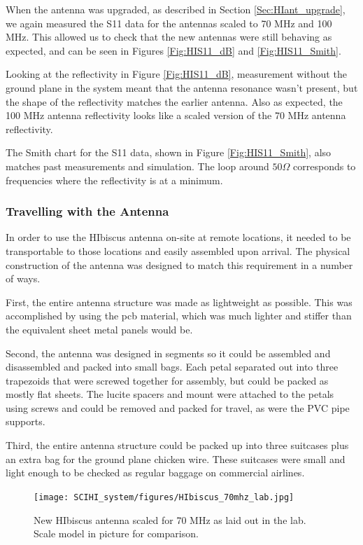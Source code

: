 When the antenna was upgraded, as described in Section \ref{Sec:HIant_upgrade}, we again measured the S11 data for the antennas scaled to 70 MHz and 100 MHz. This allowed us to check that the new antennas were still behaving as expected, and can be seen in Figures \ref{Fig:HIS11_dB} and \ref{Fig:HIS11_Smith}. 

Looking at the reflectivity in Figure \ref{Fig:HIS11_dB}, measurement without the ground plane in the system meant that the antenna resonance wasn't present, but the shape of the reflectivity matches the earlier antenna. Also as expected, the 100 MHz antenna reflectivity looks like a scaled version of the 70 MHz antenna reflectivity. 

The Smith chart for the S11 data, shown in Figure \ref{Fig:HIS11_Smith}, also matches past measurements and simulation. The loop around $50 \Omega$ corresponds to frequencies where the reflectivity is at a minimum. 

\subsubsection{Travelling with the Antenna}
In order to use the HIbiscus antenna on-site at remote locations, it needed to be transportable to those locations and easily assembled upon arrival. The physical construction of the antenna was designed to match this requirement in a number of ways. 

First, the entire antenna structure was made as lightweight as possible. This was accomplished by using the pcb material, which was much lighter and stiffer than the equivalent sheet metal panels would be. 

Second, the antenna was designed in segments so it could be assembled and disassembled and packed into small bags. Each petal separated out into three trapezoids that were screwed together for assembly, but could be packed as mostly flat sheets. The lucite spacers and mount were attached to the petals using screws and could be removed and packed for travel, as were the PVC pipe supports. 

Third, the entire antenna structure could be packed up into three suitcases plus an extra bag for the ground plane chicken wire. These suitcases were small and light enough to be checked as regular baggage on commercial airlines. 

\begin{figure}[htb]
\begin{center}
\texttt{[image: SCIHI\_system/figures/HIbiscus\_70mhz\_lab.jpg]}
\caption{New HIbiscus antenna scaled for 70 MHz as laid out in the lab. Scale model in picture for comparison.}
\label{Fig:hibiscus_70}
\end{center}
\end{figure}

